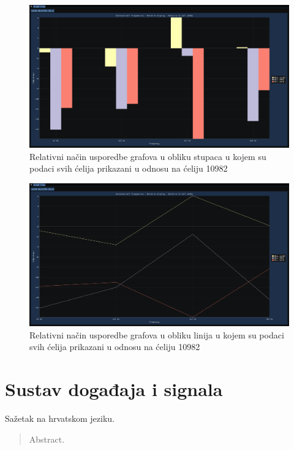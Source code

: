\documentclass[times, utf8, diplomski]{fer}
\begin{document}
\begin{figure}[H]
	\centering
	\includegraphics[width=\textwidth]{relative_graph_display_bars_cell_10982.png}
	\caption{Relativni način usporedbe grafova u obliku stupaca u kojem su podaci svih ćelija prikazani u odnosu na ćeliju 10982}
    \label{appendix:relative_graph_display_bars}
\end{figure}

\begin{figure}[H]
	\centering
	\includegraphics[width=\textwidth]{relative_graph_display_lines_cell_10982.png}
	\caption{Relativni način usporedbe grafova u obliku linija u kojem su podaci svih ćelija prikazani u odnosu na ćeliju 10982}
    \label{appendix:relative_graph_display_lines}
\end{figure}

\chapter{Sustav događaja i signala} \label{appendix:event-signal-system}

\begin{sazetak}
Sažetak na hrvatskom jeziku.

\end{sazetak}

\begin{abstract}
Abstract.

\end{abstract}
\end{document}
